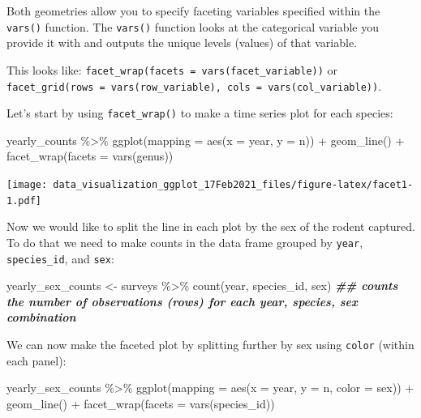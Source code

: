 \documentclass[
]{article}
\newenvironment{Shaded}{\begin{snugshade}}{\end{snugshade}}
\newcommand{\AttributeTok}[1]{\textcolor[rgb]{0.77,0.63,0.00}{#1}}
\newcommand{\DocumentationTok}[1]{\textcolor[rgb]{0.56,0.35,0.01}{\textbf{\textit{#1}}}}
\newcommand{\FunctionTok}[1]{\textcolor[rgb]{0.00,0.00,0.00}{#1}}
\newcommand{\NormalTok}[1]{#1}
\newcommand{\OtherTok}[1]{\textcolor[rgb]{0.56,0.35,0.01}{#1}}
\newcommand{\SpecialCharTok}[1]{\textcolor[rgb]{0.00,0.00,0.00}{#1}}
\begin{document}
Both geometries allow you to specify faceting variables specified within
the \texttt{vars()} function. The \texttt{vars()} function looks at the
categorical variable you provide it with and outputs the unique levels
(values) of that variable.

This looks like: \texttt{facet\_wrap(facets\ =\ vars(facet\_variable))}
or
\texttt{facet\_grid(rows\ =\ vars(row\_variable),\ cols\ =\ vars(col\_variable))}.

Let's start by using \texttt{facet\_wrap()} to make a time series plot
for each species:

\begin{Shaded}
\begin{Highlighting}[]
\NormalTok{yearly\_counts }\SpecialCharTok{\%\textgreater{}\%} 
  \FunctionTok{ggplot}\NormalTok{(}\AttributeTok{mapping =} \FunctionTok{aes}\NormalTok{(}\AttributeTok{x =}\NormalTok{ year, }\AttributeTok{y =}\NormalTok{ n)) }\SpecialCharTok{+}
  \FunctionTok{geom\_line}\NormalTok{() }\SpecialCharTok{+}
  \FunctionTok{facet\_wrap}\NormalTok{(}\AttributeTok{facets =} \FunctionTok{vars}\NormalTok{(genus))}
\end{Highlighting}
\end{Shaded}

\texttt{[image: data\_visualization\_ggplot\_17Feb2021\_files/figure-latex/facet1-1.pdf]}

Now we would like to split the line in each plot by the sex of the
rodent captured. To do that we need to make counts in the data frame
grouped by \texttt{year}, \texttt{species\_id}, and \texttt{sex}:

\begin{Shaded}
\begin{Highlighting}[]
\NormalTok{yearly\_sex\_counts }\OtherTok{\textless{}{-}}\NormalTok{ surveys }\SpecialCharTok{\%\textgreater{}\%}
  \FunctionTok{count}\NormalTok{(year, species\_id, sex)}
\DocumentationTok{\#\# counts the number of observations (rows) for each year, species, sex combination}
\end{Highlighting}
\end{Shaded}

We can now make the faceted plot by splitting further by sex using
\texttt{color} (within each panel):

\begin{Shaded}
\begin{Highlighting}[]
\NormalTok{yearly\_sex\_counts }\SpecialCharTok{\%\textgreater{}\%} 
  \FunctionTok{ggplot}\NormalTok{(}\AttributeTok{mapping =} \FunctionTok{aes}\NormalTok{(}\AttributeTok{x =}\NormalTok{ year, }\AttributeTok{y =}\NormalTok{ n, }\AttributeTok{color =}\NormalTok{ sex)) }\SpecialCharTok{+}
  \FunctionTok{geom\_line}\NormalTok{() }\SpecialCharTok{+}
  \FunctionTok{facet\_wrap}\NormalTok{(}\AttributeTok{facets =}  \FunctionTok{vars}\NormalTok{(species\_id))}
\end{Highlighting}
\end{Shaded}
\end{document}
